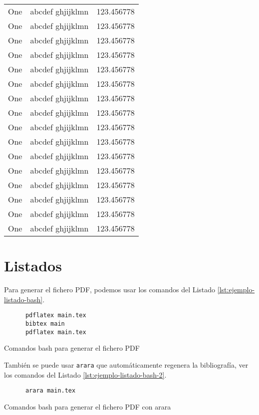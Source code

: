 \begin{longtable}{|l|l|l|}
    One & abcdef ghjijklmn & 123.456778 \\
    One & abcdef ghjijklmn & 123.456778 \\
    One & abcdef ghjijklmn & 123.456778 \\
    One & abcdef ghjijklmn & 123.456778 \\
    One & abcdef ghjijklmn & 123.456778 \\
    One & abcdef ghjijklmn & 123.456778 \\
    One & abcdef ghjijklmn & 123.456778 \\
    One & abcdef ghjijklmn & 123.456778 \\
    One & abcdef ghjijklmn & 123.456778 \\
    One & abcdef ghjijklmn & 123.456778 \\
    One & abcdef ghjijklmn & 123.456778 \\
    One & abcdef ghjijklmn & 123.456778 \\
    One & abcdef ghjijklmn & 123.456778 \\
    One & abcdef ghjijklmn & 123.456778 \\
    One & abcdef ghjijklmn & 123.456778 \\
    One & abcdef ghjijklmn & 123.456778 \\
    \end{longtable}
  
  \section{Listados}
  
  Para generar el fichero PDF, podemos usar los comandos del Listado \ref{lst:ejemplo-listado-bash}.
  
  \begin{listing}[!htb]
    \begin{verbatim}
      pdflatex main.tex
      bibtex main
      pdflatex main.tex
    \end{verbatim}
    \vspace*{-1cm}
    \captionsetup{type=lstlisting}
    \caption{Comandos bash para generar el fichero PDF}
    \label{lst:ejemplo-listado-bash}
  \end{listing}

  También se puede usar \texttt{arara} que automáticamente regenera la bibliografía, ver los comandos del Listado \ref{lst:ejemplo-listado-bash-2}.

  \begin{listing}[!htb]
    \begin{verbatim}
      arara main.tex
    \end{verbatim}
    \vspace*{-1cm}
    \captionsetup{type=lstlisting}
    \caption{Comandos bash para generar el fichero PDF con arara}
    \label{lst:ejemplo-listado-bash-2}
  \end{listing}

